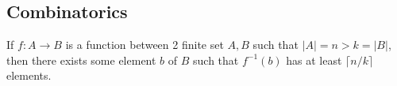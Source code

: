 \documentclass{treatise}
\begin{document}
\begin{shaded}
\chapter{Combinatorics}
\begin{theorem}
\end{theorem}
\begin{theorem}
If $f: A \to B$ is a function between 2 finite set $A, B$ such that $|A| = n > k = |B|$, then there exists some element $b$ of $B$ such that $f^{-1}(b)$ has at least $\lceil n/k \rceil$ elements.
\end{theorem}

\end{shaded}
\end{document}
